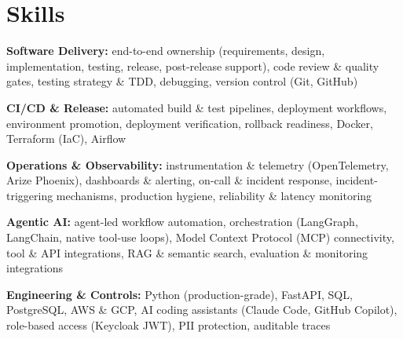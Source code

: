 \documentclass[10pt,a4paper]{article}
\begin{document}
\section{Skills}
\begin{tight}
  \item[\textcolor{accent}{\small$\bullet$}] \textbf{Software Delivery:} end-to-end ownership (requirements, design, implementation, testing, release, post-release support), code review \& quality gates, testing strategy \& TDD, debugging, version control (Git, GitHub)
  \item[\textcolor{accent}{\small$\bullet$}] \textbf{CI/CD \& Release:} automated build \& test pipelines, deployment workflows, environment promotion, deployment verification, rollback readiness, Docker, Terraform (IaC), Airflow
  \item[\textcolor{accent}{\small$\bullet$}] \textbf{Operations \& Observability:} instrumentation \& telemetry (OpenTelemetry, Arize Phoenix), dashboards \& alerting, on-call \& incident response, incident-triggering mechanisms, production hygiene, reliability \& latency monitoring
  \item[\textcolor{accent}{\small$\bullet$}] \textbf{Agentic AI:} agent-led workflow automation, orchestration (LangGraph, LangChain, native tool-use loops), Model Context Protocol (MCP) connectivity, tool \& API integrations, RAG \& semantic search, evaluation \& monitoring integrations
  \item[\textcolor{accent}{\small$\bullet$}] \textbf{Engineering \& Controls:} Python (production-grade), FastAPI, SQL, PostgreSQL, AWS \& GCP, AI coding assistants (Claude Code, GitHub Copilot), role-based access (Keycloak JWT), PII protection, auditable traces
\end{tight}

\end{document}
